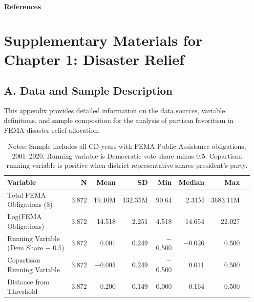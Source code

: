 \documentclass[12pt,letterpaper,oneside]{book}
\begin{document}
\clearpage
{}
{}

\begin{center}
\textbf{References}
\end{center}





\appendix
\renewcommand{\chaptername}{Appendix}

\chapter{Supplementary Materials for Chapter 1: Disaster Relief}



\setcounter{table}{0}
\renewcommand{\thetable}{A\arabic{table}}
\setcounter{figure}{0}
\renewcommand{\thefigure}{A\arabic{figure}}

\section*{A. Data and Sample Description}

This appendix provides detailed information on the data sources, variable definitions, and sample composition for the analysis of partisan favoritism in FEMA disaster relief allocation.

\begin{table}[H]
\centering
\caption{Summary Statistics: Main Analysis Variables}
\label{tab:summary_stats}
\begin{tabular}{lrrrrrrr}
\toprule
Variable & N & Mean & SD & Min & Median & Max \\
\midrule
Total FEMA Obligations (\$) & 3,872 & 19.10M & 132.35M & 90.64 & 2.31M & 3683.11M \\
Log(FEMA Obligations) & 3,872 & 14.518 & 2.251 & 4.518 & 14.654 & 22.027 \\
Running Variable (Dem Share $-$ 0.5) & 3,872 & 0.001 & 0.249 & $-$0.500 & $-$0.026 & 0.500 \\
Copartisan Running Variable & 3,872 & $-$0.005 & 0.249 & $-$0.500 & 0.011 & 0.500 \\
Distance from Threshold & 3,872 & 0.200 & 0.149 & 0.000 & 0.164 & 0.500 \\
\bottomrule
\end{tabular}
\caption*{\footnotesize Notes: Sample includes all CD-years with FEMA Public Assistance obligations, 2001--2020. Running variable is Democratic vote share minus 0.5. Copartisan running variable is positive when district representative shares president's party.}
\end{table}
\end{document}
